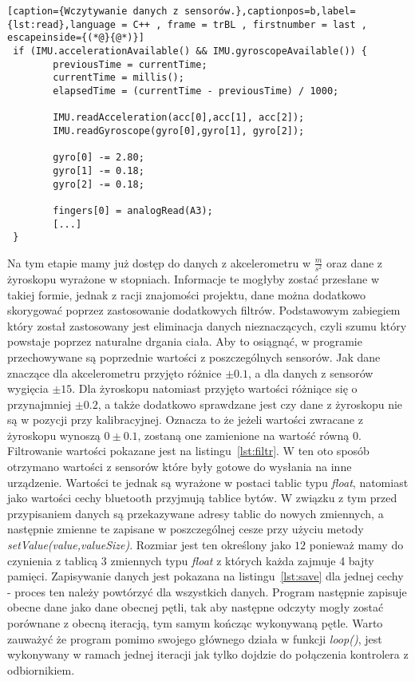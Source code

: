 \begin{lstlisting}[caption={Wczytywanie danych z sensorów.},captionpos=b,label={lst:read},language = C++ , frame = trBL , firstnumber = last , escapeinside={(*@}{@*)}]
 if (IMU.accelerationAvailable() && IMU.gyroscopeAvailable()) {
        previousTime = currentTime;
        currentTime = millis();
        elapsedTime = (currentTime - previousTime) / 1000;   

        IMU.readAcceleration(acc[0],acc[1], acc[2]);  
        IMU.readGyroscope(gyro[0],gyro[1], gyro[2]);
        
        gyro[0] -= 2.80;
        gyro[1] -= 0.18;
        gyro[2] -= 0.18;

        fingers[0] = analogRead(A3);
        [...]
 }
\end{lstlisting}
Na tym etapie mamy już dostęp do danych z akcelerometru w {\Large $\frac{m}{s^2}$} oraz dane z żyroskopu wyrażone w stopniach. Informacje te mogłyby zostać przesłane w takiej formie, jednak z racji znajomości projektu, dane można dodatkowo skorygować poprzez zastosowanie dodatkowych filtrów. Podstawowym zabiegiem który został zastosowany jest eliminacja danych nieznaczących, czyli szumu który powstaje poprzez naturalne drgania ciała. Aby to osiągnąć, w programie przechowywane są poprzednie wartości z poszczególnych sensorów. Jak dane znaczące dla akcelerometru przyjęto różnice $\pm 0.1$, a dla danych z sensorów wygięcia $\pm 15$. Dla żyroskopu natomiast przyjęto wartości różniące się o przynajmniej $\pm 0.2$, a także dodatkowo sprawdzane jest czy dane z żyroskopu nie są w pozycji przy kalibracyjnej. Oznacza to że jeżeli wartości zwracane z żyroskopu wynoszą $0\pm 0.1$, zostaną one zamienione na wartość równą $0$. Filtrowanie wartości pokazane jest na listingu~\ref{lst:filtr}. W ten oto sposób otrzymano wartości z sensorów które były gotowe do wysłania na inne urządzenie. Wartości te jednak są wyrażone w postaci tablic typu \textit{float}, natomiast jako wartości cechy bluetooth przyjmują tablice bytów. W związku z tym przed przypisaniem danych są przekazywane adresy tablic do nowych zmiennych, a następnie zmienne te zapisane w poszczególnej cesze przy użyciu metody \textit{setValue(value,valueSize)}. Rozmiar jest ten określony jako $12$ ponieważ mamy do czynienia z tablicą 3 zmiennych typu \textit{float} z których każda zajmuje 4 bajty pamięci. Zapisywanie danych jest pokazana na listingu~\ref{lst:save} dla jednej cechy - proces ten należy powtórzyć dla wszystkich danych. Program następnie zapisuje obecne dane jako dane obecnej pętli, tak aby następne odczyty mogły zostać porównane z obecną iteracją, tym samym kończąc wykonywaną pętle. Warto zauważyć że program pomimo swojego głównego działa w funkcji \textit{loop()}, jest wykonywany w ramach jednej iteracji jak tylko dojdzie do połączenia kontrolera z odbiornikiem.
